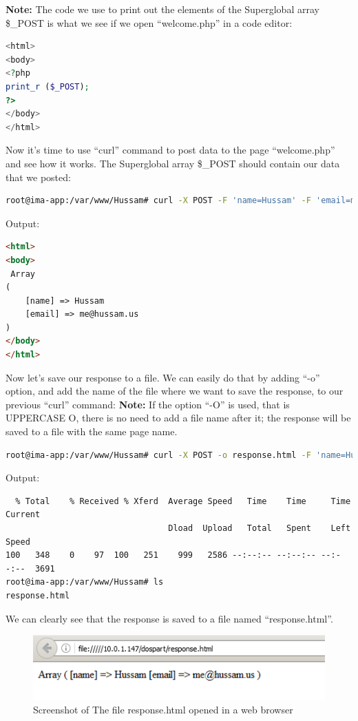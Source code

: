 \documentclass[a4paper, 11pt]{article}
\begin{document}
\textbf{Note:}
The code we use to print out the elements of the Superglobal array \$\_POST is what we see if we open ``welcome.php'' in a code editor:

\begin{lstlisting}[language=php]
<html>
<body>
<?php
print_r ($_POST); 
?>
</body>
</html>
\end{lstlisting}

Now it's time to use ``curl'' command to post data to the page ``welcome.php'' and see how it works. The Superglobal array \$\_POST should contain our data that we posted:

\begin{lstlisting}[language=bash] 
root@ima-app:/var/www/Hussam# curl -X POST -F 'name=Hussam' -F 'email=me@hussam.us' http://www.cs.odu.edu/~hhallak/532/A1/Q1/welcome.php

\end{lstlisting}
Output:
\begin{lstlisting}[language=html]
<html>
<body>
 Array
(
    [name] => Hussam
    [email] => me@hussam.us
)
</body>
</html> 

\end{lstlisting}

Now let's save our response to a file. We can easily do that by adding ``-o'' option, and add the name of the file where we want to save the response, to our previous ``curl'' command:
\textbf{Note:}
If the option ``-O'' is used, that is UPPERCASE O, there is no need to add a file name after it; the response will be saved to a file with the same page name.

\begin{lstlisting}[language=bash]
root@ima-app:/var/www/Hussam# curl -X POST -o response.html -F 'name=Hussam' -F 'email=me@hussam.us' http://www.cs.odu.edu/~hhallak/532/A1/Q1/welcome.php

\end{lstlisting}
Output:
\begin{lstlisting} 
  % Total    % Received % Xferd  Average Speed   Time    Time     Time  Current
                                 Dload  Upload   Total   Spent    Left  Speed
100   348    0    97  100   251    999   2586 --:--:-- --:--:-- --:--:--  3691
root@ima-app:/var/www/Hussam# ls
response.html
\end{lstlisting}
We can clearly see that the response is saved to a file named ``response.html''.

\begin{figure}[h]

\caption{Screenshot of The file response.html opened in a web browser}
\centering
\includegraphics{screen_shot.png}

\end{figure}
\end{document}
